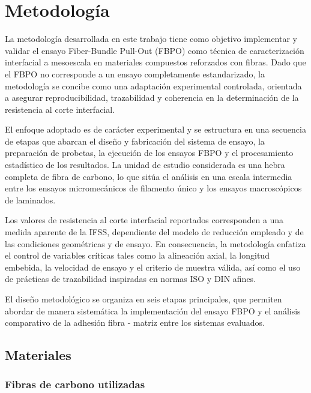 
\section{Metodología}

La metodología desarrollada en este trabajo tiene como objetivo implementar y validar el
ensayo Fiber-Bundle Pull-Out (FBPO) como técnica de caracterización interfacial a mesoescala
en materiales compuestos reforzados con fibras. Dado que el FBPO no corresponde a un
ensayo completamente estandarizado, la metodología se concibe como una adaptación
experimental controlada, orientada a asegurar reproducibilidad, trazabilidad y coherencia
en la determinación de la resistencia al corte interfacial.

El enfoque adoptado es de carácter experimental y se estructura en una secuencia de etapas
que abarcan el diseño y fabricación del sistema de ensayo, la preparación de probetas,
la ejecución de los ensayos FBPO y el procesamiento estadístico de los resultados. La unidad
de estudio considerada es una hebra completa de fibra de carbono, lo que sitúa el análisis en
una escala intermedia entre los ensayos micromecánicos de filamento único y los ensayos
macroscópicos de laminados.

Los valores de resistencia al corte interfacial reportados corresponden a una medida
aparente de la IFSS, dependiente del modelo de reducción empleado y de las condiciones
geométricas y de ensayo. En consecuencia, la metodología enfatiza el control de variables
críticas tales como la alineación axial, la longitud embebida, la velocidad de ensayo y el
criterio de muestra válida, así como el uso de prácticas de trazabilidad inspiradas en normas
ISO y DIN afines.

El diseño metodológico se organiza en seis etapas principales, que permiten abordar de
manera sistemática la implementación del ensayo FBPO y el análisis comparativo de la
adhesión fibra - matriz entre los sistemas evaluados.

\subsection{Materiales}

\subsubsection{Fibras de carbono utilizadas}

